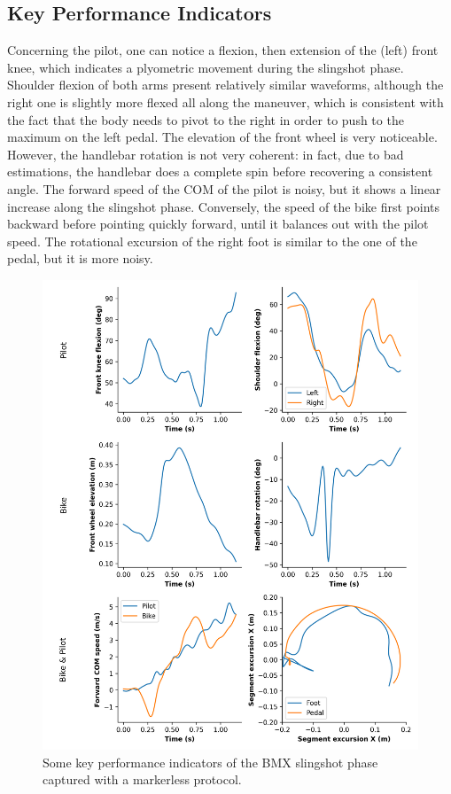 \FloatBarrier
\subsection{Key Performance Indicators}

Concerning the pilot, one can notice a flexion, then extension of the (left) front knee, which indicates a plyometric movement during the slingshot phase. Shoulder flexion of both arms present relatively similar waveforms, although the right one is slightly more flexed all along the maneuver, which is consistent with the fact that the body needs to pivot to the right in order to push to the maximum on the left pedal. The elevation of the front wheel is very noticeable. However, the handlebar rotation is not very coherent: in fact, due to bad estimations, the handlebar does a complete spin before recovering a consistent angle. The forward speed of the COM of the pilot is noisy, but it shows a linear increase along the slingshot phase. Conversely, the speed of the bike first points backward before pointing quickly forward, until it balances out with the pilot speed. The rotational excursion of the right foot is similar to the one of the pedal, but it is more noisy. 

\begin{figure}[hbtp]
	\centering
	\def\svgwidth{1\columnwidth}
	\fontsize{10pt}{10pt}\selectfont
	\includegraphics[width=0.85\linewidth, left]{"../Chap7/Figures/KPIs_BMX.png"}
	\caption{Some key performance indicators of the BMX slingshot phase captured with a markerless protocol.}
	\label{fig_kpisbmx}
\end{figure}


